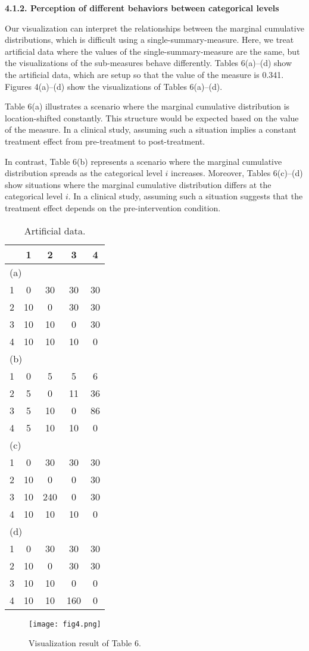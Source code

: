 \documentclass[a4j,12pt]{article}
\begin{document}
\noindent \textbf{\large 4.1.2. Perception of different behaviors between categorical levels}

Our visualization can interpret the relationships between the marginal cumulative distributions, which is difficult using a single-summary-measure. 
Here, we treat artificial data where the values of the single-summary-measure are the same, but the visualizations of the sub-measures behave differently. 
Tables 6(a)–(d) show the artificial data, which are setup so that the value of the measure is 0.341. 
Figures 4(a)–(d) show the visualizations of Tables 6(a)–(d).

Table 6(a) illustrates a scenario where the marginal cumulative distribution is location-shifted constantly. 
This structure would be expected based on the value of the measure. 
In a clinical study, assuming such a situation implies a constant treatment effect from pre-treatment to post-treatment.

In contrast, Table 6(b) represents a scenario where the marginal cumulative distribution spreads as the categorical level $i$ increases.
Moreover, Tables 6(c)–(d) show situations where the marginal cumulative distribution differs at the categorical level $i$. 
In a clinical study, assuming such a situation suggests that the treatment effect depends on the pre-intervention condition.
\begin{table}[h]
\small\sf\centering
\caption{Artificial data.\label{T6}}
\begin{tabular}[!bh]{ccccc} \hline
	& 1	& 2	& 3	& 4	\\ \hline
\multicolumn{5}{l}{(a)}\\ 
1	& 0	& 30	& 30	& 30	\\
2	& 10	& 0	& 30	& 30	\\
3	& 10	& 10	& 0	& 30	\\
4	& 10	& 10	& 10	& 0	\\ \hline
\multicolumn{5}{l}{(b)}\\ 
1	& 0	& 5	& 5	& 6	\\
2	& 5	& 0	& 11	& 36	\\
3	& 5	& 10	& 0	& 86	\\
4	& 5	& 10	& 10	& 0	\\ \hline
\multicolumn{5}{l}{(c)}\\ 
1	& 0	& 30	& 30	& 30	\\
2	& 10	& 0	& 0	& 30	\\
3	& 10	& 240	& 0	& 30	\\
4	& 10	& 10	& 10	& 0	\\ \hline
\multicolumn{5}{l}{(d)}\\ 
1	& 0	& 30	& 30	& 30	\\
2	& 10	& 0	& 30	& 30	\\
3	& 10	& 10	& 0	& 0	\\
4	& 10	& 10	& 160	& 0	\\ \hline
\end{tabular}
\end{table}
\begin{figure}[h]
\centering
\texttt{[image: fig4.png]}
\caption{Visualization result of Table 6.}
\end{figure}
\\
\end{document}
